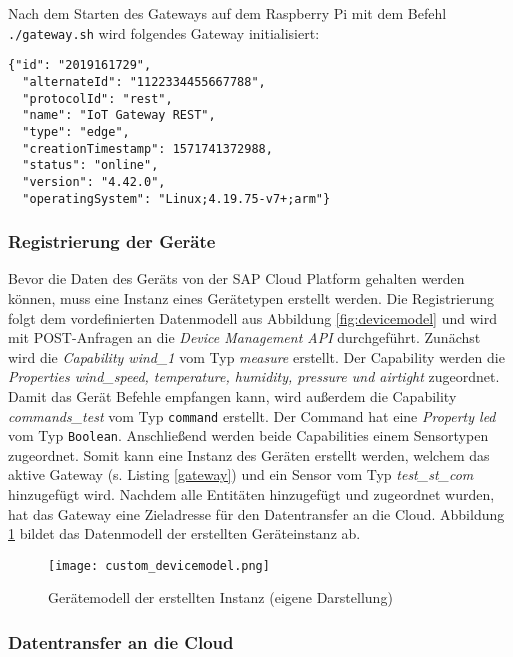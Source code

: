\noindent Nach dem Starten des Gateways auf dem Raspberry Pi mit dem Befehl \texttt{./gateway.sh} wird folgendes Gateway initialisiert:

\begin{lstlisting}[caption= Gateway-Eigenschaften, label=gateway]
  {"id": "2019161729",
  "alternateId": "1122334455667788",
  "protocolId": "rest",
  "name": "IoT Gateway REST",
  "type": "edge",
  "creationTimestamp": 1571741372988,
  "status": "online",
  "version": "4.42.0",
  "operatingSystem": "Linux;4.19.75-v7+;arm"}\end{lstlisting}

\subsubsection{Registrierung der Geräte}

Bevor die Daten des Geräts von der SAP Cloud Platform gehalten werden können, muss eine Instanz eines Gerätetypen erstellt werden. Die Registrierung folgt dem vordefinierten Datenmodell aus Abbildung \ref{fig:devicemodel} und wird mit POST-Anfragen an die \textit{Device Management API} durchgeführt. Zunächst wird die \textit{Capability wind\_1} vom Typ \textit{measure} erstellt. Der Capability werden die \textit{Properties wind\_speed, temperature, humidity, pressure und airtight} zugeordnet. Damit das Gerät Befehle empfangen kann, wird außerdem die Capability \textit{commands\_test} vom Typ \texttt{command} erstellt. Der Command hat eine \textit{Property led} vom Typ \texttt{Boolean}. Anschließend werden beide Capabilities einem Sensortypen zugeordnet. Somit kann eine Instanz des Geräten erstellt werden, welchem das aktive Gateway (s. Listing \ref{gateway}) und ein Sensor vom Typ \textit{test\_st\_com} hinzugefügt wird. Nachdem alle Entitäten hinzugefügt und zugeordnet wurden, hat das Gateway eine Zieladresse für den Datentransfer an die Cloud. Abbildung \ref{customdevicemodel} bildet das Datenmodell der erstellten Geräteinstanz ab.

\begin{figure} [H]
  \texttt{[image: custom\_devicemodel.png]}
  \caption[Gerätemodell der erstellten Instanz]{Gerätemodell der erstellten Instanz (eigene Darstellung)}
  \label{customdevicemodel}
\end{figure}
\newpage

\subsubsection{Datentransfer an die Cloud}

